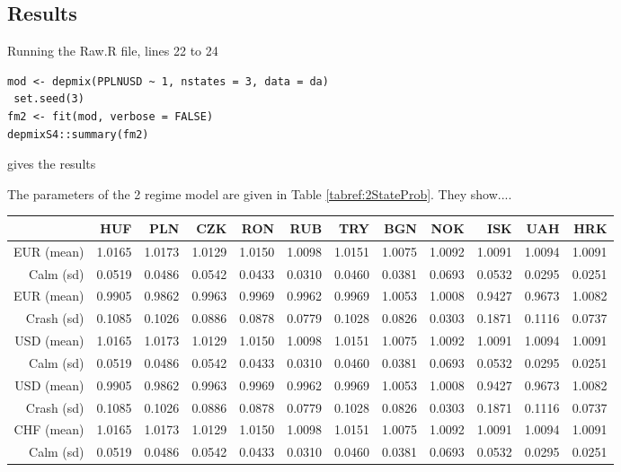 \documentclass[12pt, a4paper, oneside]{article} %
\begin{document}
\subsection{Results}
Running the Raw.R file, lines 22 to 24
\begin{lstlisting}
mod <- depmix(PPLNUSD ~ 1, nstates = 3, data = da)
 set.seed(3)
fm2 <- fit(mod, verbose = FALSE)
depmixS4::summary(fm2)
\end{lstlisting}

gives the results
 
 
The parameters of the 2 regime model are given in Table \ref{tabref:2StateProb}.  They show....


\begin{landscape}
\begin{table}[ht]
\centering
\begin{tabular}{rrrrrrrrrrrr}
  \hline
 & HUF & PLN & CZK & RON & RUB & TRY & BGN & NOK & ISK & UAH & HRK \\ 
  \hline
  EUR (mean) & 1.0165 & 1.0173 & 1.0129 & 1.0150 & 1.0098 & 1.0151 & 1.0075 & 1.0092 & 1.0091 & 1.0094 & 1.0091 \\ 
  Calm (sd) & 0.0519 & 0.0486 & 0.0542 & 0.0433 & 0.0310 & 0.0460 & 0.0381 & 0.0693 & 0.0532 & 0.0295 & 0.0251 \\ 
  EUR (mean) & 0.9905 & 0.9862 & 0.9963 & 0.9969 & 0.9962 & 0.9969 & 1.0053 & 1.0008 & 0.9427 & 0.9673 & 1.0082 \\ 
  Crash (sd) & 0.1085 & 0.1026 & 0.0886 & 0.0878 & 0.0779 & 0.1028 & 0.0826 & 0.0303 & 0.1871 & 0.1116 & 0.0737 \\ 
  \hline
  USD (mean) & 1.0165 & 1.0173 & 1.0129 & 1.0150 & 1.0098 & 1.0151 & 1.0075 & 1.0092 & 1.0091 & 1.0094 & 1.0091 \\ 
  Calm (sd) & 0.0519 & 0.0486 & 0.0542 & 0.0433 & 0.0310 & 0.0460 & 0.0381 & 0.0693 & 0.0532 & 0.0295 & 0.0251 \\ 
  USD (mean) & 0.9905 & 0.9862 & 0.9963 & 0.9969 & 0.9962 & 0.9969 & 1.0053 & 1.0008 & 0.9427 & 0.9673 & 1.0082 \\ 
  Crash (sd) & 0.1085 & 0.1026 & 0.0886 & 0.0878 & 0.0779 & 0.1028 & 0.0826 & 0.0303 & 0.1871 & 0.1116 & 0.0737 \\ 
  \hline
  CHF (mean)& 1.0165 & 1.0173 & 1.0129 & 1.0150 & 1.0098 & 1.0151 & 1.0075 & 1.0092 & 1.0091 & 1.0094 & 1.0091 \\ 
  Calm (sd)& 0.0519 & 0.0486 & 0.0542 & 0.0433 & 0.0310 & 0.0460 & 0.0381 & 0.0693 & 0.0532 & 0.0295 & 0.0251 \\ 

\end{tabular}
\end{table}
\end{landscape}
\end{document}
